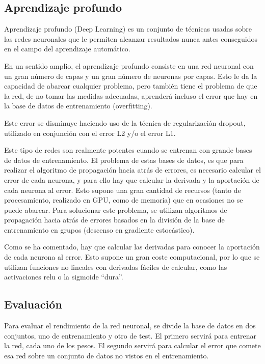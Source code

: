 \subsection{Aprendizaje profundo}
Aprendizaje profundo (Deep Learning) \cite{schmidhuber2015deep}\cite{udacitydeeplearning} es un conjunto de técnicas usadas sobre las redes neuronales que le permiten alcanzar resultados nunca antes conseguidos en el campo del aprendizaje automático.

En un sentido amplio, el aprendizaje profundo consiste en una red neuronal con un gran número de capas y un gran número de neuronas por capas. Esto le da la capacidad de abarcar cualquier problema, pero también tiene el problema de que la red, de no tomar las medidas adecuadas, aprenderá incluso el error que hay en la base de datos de entrenamiento (overfitting).

Este error se disminuye haciendo uso de la técnica de regularización dropout, utilizado en conjunción con el error L2 y/o el error L1.

Este tipo de redes son realmente potentes cuando se entrenan con grande bases de datos de entrenamiento. El problema de estas bases de datos, es que para realizar el algoritmo de propagación hacia atrás de errores, es necesario calcular el error de cada neurona, y para ello hay que calcular la derivada y la aportación de cada neurona al error. Esto supone una gran cantidad de recursos (tanto de procesamiento, realizado en GPU, como de memoria) que en ocasiones no se puede abarcar. Para solucionar este problema, se utilizan algoritmos de propagación hacia atrás de errores basados en la división de la base de entrenamiento en grupos (descenso en gradiente estocástico).

Como se ha comentado, hay que calcular las derivadas para conocer la aportación de cada neurona al error. Esto supone un gran coste computacional, por lo que se utilizan funciones no lineales con derivadas fáciles de calcular, como las activaciones relu o la sigmoide ``dura''.

\subsection{Evaluación}
Para evaluar el rendimiento de la red neuronal, se divide la base de datos en dos conjuntos, uno de entrenamiento y otro de test. El primero servirá para entrenar la red, cada uno de los pesos. El segundo servirá para calcular el error que comete esa red sobre un conjunto de datos no vistos en el entrenamiento.

